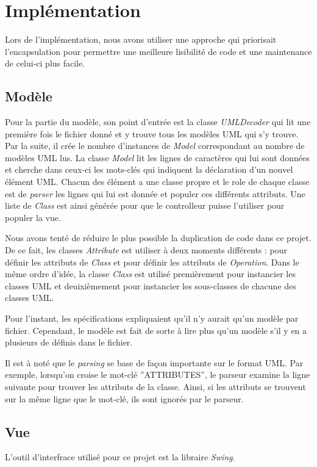 \documentclass[12pt]{article} %
\begin{document}
\section{Implémentation}
Lors de l'implémentation, nous avons utiliser une approche qui priorisait l'encapsulation pour permettre une meilleure lisibilité de code et une maintenance de celui-ci plus facile.

\subsection{Modèle}
Pour la partie du modèle, son point d'entrée est la classe \textit{UMLDecoder} qui lit une première fois le fichier donné et y trouve tous les modèles UML qui s'y trouve.  Par la suite, il crée le nombre d'instances de \textit{Model} correspondant au nombre de modèles UML lus.  La classe \textit{Model} lit les lignes de caractères qui lui sont données et cherche dans ceux-ci les mots-clés qui indiquent la déclaration d'un nouvel élément UML.  Chacun des élément a une classe propre et le role de chaque classe est de \textit{parser} les lignes qui lui est donnée et populer ces différents attributs.  Une liste de \textit{Class} est ainsi générée pour que le controlleur puisse l'utiliser pour populer la vue.

Nous avons tenté de réduire le plus possible la duplication de code dans ce projet.  De ce fait, les classes \textit{Attribute} est utiliser à deux moments différents : pour définir les attributs de \textit{Class} et pour définir les attributs de \textit{Operation}.  Dans le même ordre d'idée, la classe \textit{Class} est utilisé premièrement pour instancier les classes UML et deuixièmement pour instancier les sous-classes de chacune des classes UML.

Pour l'instant, les spécifications expliquaient qu'il n'y aurait qu'un modèle par fichier.  Cependant, le modèle est fait de sorte à lire plus qu'un modèle s'il y en a plusieurs de définis dans le fichier.

Il est à noté que le \textit{parsing} se base de façon importante sur le format UML.  Par exemple, lorsqu'on croise le mot-clé ''ATTRIBUTES'', le parseur examine la ligne suivante pour trouver les attributs de la classe.  Ainsi, si les attributs se trouvent sur la même ligne que le mot-clé, ils sont ignorés par le parseur.


\subsection{Vue}
L'outil d'interfrace utilisé pour ce projet est la libraire \textit{Swing}. 
\end{document}
